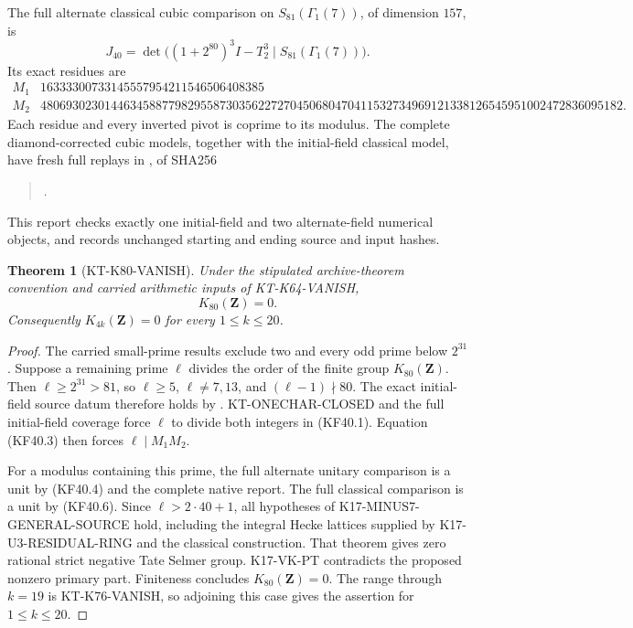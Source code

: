 \documentclass[11pt,a4paper]{article}
\newtheorem{theorem}{Theorem}[section]
\theoremstyle{definition}
\begin{document}
The full alternate classical cubic comparison on
$S_{81}(\Gamma_1(7))$, of dimension $157$, is
\[
 J_{40}=\det\bigl((1+2^{80})^3I-T_2^3
                              \mid S_{81}(\Gamma_1(7))\bigr).
                                                               \tag{KF40.5}
\]
Its exact residues are
{\scriptsize
\[
\begin{array}{c|r}
 M_1&16333300733145557954211546506408385\\
 M_2&4806930230144634588779829558730356227270450680470411532734969121338126545951002472836095182.
\end{array}                                                \tag{KF40.6}
\]
}
Each residue and every inverted pivot is coprime to its modulus.
The complete diamond-corrected cubic models, together with the
initial-field classical model, have fresh full replays in
, of SHA256
\begin{quote}\small
{}.
\end{quote}
This report checks exactly one initial-field and two
alternate-field numerical objects, and records unchanged
starting and ending source and input hashes.

\begin{theorem}[KT-K80-VANISH]
\label{thm:kt-k80-vanish}
Under the stipulated archive-theorem convention and carried
arithmetic inputs of KT-K64-VANISH,
\[
                         K_{80}(\mathbf Z)=0.
\]
Consequently $K_{4k}(\mathbf Z)=0$ for every $1\leq k\leq20$.
\end{theorem}
\begin{proof}
The carried small-prime results exclude two and every odd prime
below $2^{31}$.  Suppose a remaining prime $\ell$ divides
the order of the finite group $K_{80}(\mathbf Z)$.
Then $\ell\geq2^{31}>81$, so $\ell\geq5$, $\ell\ne7,13$,
and $(\ell-1)\nmid80$.  The exact initial-field source datum
therefore holds by .
KT-ONECHAR-CLOSED and the full initial-field coverage force
$\ell$ to divide both integers in (KF40.1).  Equation (KF40.3)
then forces $\ell\mid M_1M_2$.

For a modulus containing this prime, the full alternate
unitary comparison is a unit by (KF40.4) and the complete
native report.  The full classical comparison is a unit
by (KF40.6).  Since $\ell>2\cdot40+1$, all hypotheses of
K17-MINUS7-GENERAL-SOURCE hold, including the integral Hecke
lattices supplied by K17-U3-RESIDUAL-RING and the classical
construction.  That theorem gives zero rational strict
negative Tate Selmer group.  K17-VK-PT contradicts the
proposed nonzero primary part.  Finiteness concludes
$K_{80}(\mathbf Z)=0$.
The range through $k=19$ is KT-K76-VANISH, so adjoining this
case gives the assertion for $1\leq k\leq20$.
\end{proof}
\end{document}
